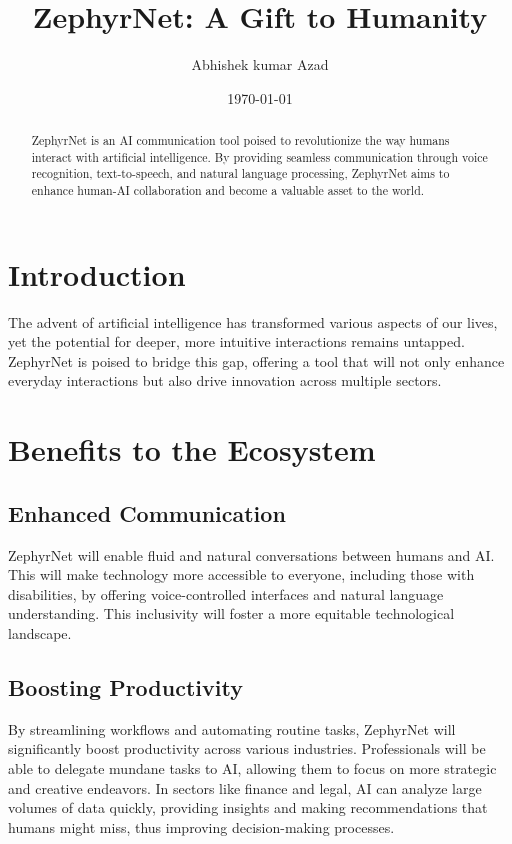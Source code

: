 \documentclass{article}
\title{ZephyrNet: A Gift to Humanity}
\author{Abhishek kumar Azad}
\date{\today}
\begin{document}
	
	\maketitle
	
	\begin{abstract}
		ZephyrNet is an AI communication tool poised to revolutionize the way humans interact with artificial intelligence. By providing seamless communication through voice recognition, text-to-speech, and natural language processing, ZephyrNet aims to enhance human-AI collaboration and become a valuable asset to the world.
	\end{abstract}
	
	\section{Introduction}
	The advent of artificial intelligence has transformed various aspects of our lives, yet the potential for deeper, more intuitive interactions remains untapped. ZephyrNet is poised to bridge this gap, offering a tool that will not only enhance everyday interactions but also drive innovation across multiple sectors.
	
	\section{Benefits to the Ecosystem}
	
	\subsection{Enhanced Communication}
	ZephyrNet will enable fluid and natural conversations between humans and AI. This will make technology more accessible to everyone, including those with disabilities, by offering voice-controlled interfaces and natural language understanding. This inclusivity will foster a more equitable technological landscape.
	
	\subsection{Boosting Productivity}
	By streamlining workflows and automating routine tasks, ZephyrNet will significantly boost productivity across various industries. Professionals will be able to delegate mundane tasks to AI, allowing them to focus on more strategic and creative endeavors. In sectors like finance and legal, AI can analyze large volumes of data quickly, providing insights and making recommendations that humans might miss, thus improving decision-making processes.
	
\end{document}
